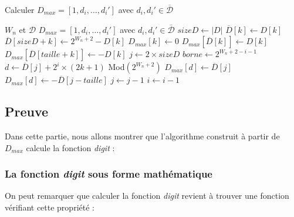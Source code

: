 \documentclass[12pt, a4paper]{memoir}
\begin{document}
 \begin{algorithm}
  \caption{Calculer $D_{max} = [1,d_i,\ldots,d_i']$ avec $d_i,d_i' \in \overline{\mathcal{D}}$}
  \begin{algorithmic}
   \REQUIRE $W_n$ et $\mathcal{D}$
   \ENSURE $D_{max} = [1,d_i,\ldots,d_i']$ avec $d_i,d_i' \in \overline{\mathcal{D}}$
   \STATE $sizeD \leftarrow |D|$
   \STATE $\overline{D}[k] \leftarrow D[k]$
   \STATE $\overline{D}[sizeD+k] \leftarrow 2^{W_n+2}-D[k]$
   \ENDFOR
   \STATE $D_{max}[k] \leftarrow 0$
   \ENDFOR
   \STATE $D_{max}[\overline{D}[k]] \leftarrow D[k]$
   \STATE $D_{max}[\overline{D}[taille+k]] \leftarrow -D[k]$
   \ENDFOR
   \STATE $j \leftarrow 2 \times sizeD$
   \STATE $borne \leftarrow 2^{W_n+2-i-1}$
   \STATE $d \leftarrow \overline{D}[j] + 2^{i} \times (2k+1)$ Mod$(2^{W_n+2})$
   \STATE $D_{max}[d] \leftarrow \overline{D}[j]$
   \STATE $D_{max}[d] \leftarrow -\overline{D}[j-taille]$
   \ENDIF
   \ENDIF
   \ENDFOR
   \STATE $j \leftarrow j-1$
   \ENDWHILE   
   \STATE $i \leftarrow i-1$
   \ENDWHILE
  \end{algorithmic}
 \end{algorithm}

\subsection{Preuve}

Dans cette partie, nous allons montrer que l'algorithme construit à partir de \emph{$D_{max}$} calcule la fonction \emph{digit} :

\subsubsection{La fonction \emph{digit} sous forme mathématique}

On peut remarquer que calculer la fonction \emph{digit} revient à trouver une fonction vérifiant cette propriété :
\end{document}
